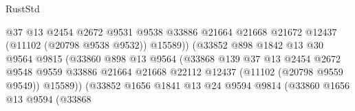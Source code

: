 \begin{lexlean}{RustStd}
\begin{coremodule}
                                            @37
                                            @13
                                            @2454
                                            @2672
                                            @9531
                                            @9538
                                            @33886
                                            @21664
                                            @21668
                                            @21672
                                            @12437
                                            (@11102 (@20798 @9538 @9532))
                                            @15589))
                                        (@33852
                                          @898
                                          @1842
                                          @13
                                          @30
                                          @9564
                                          @9815
                                          (@33860
                                            @898
                                            @13
                                            @9564
                                            (@33868
                                              @139
                                              @37
                                              @13
                                              @2454
                                              @2672
                                              @9548
                                              @9559
                                              @33886
                                              @21664
                                              @21668
                                              @22112
                                              @12437
                                              (@11102 (@20798 @9559 @9549))
                                              @15589))
                                          (@33852
                                            @1656
                                            @1841
                                            @13
                                            @24
                                            @9594
                                            @9814
                                            (@33860
                                              @1656
                                              @13
                                              @9594
                                              (@33868

\end{coremodule}
\end{lexlean}
